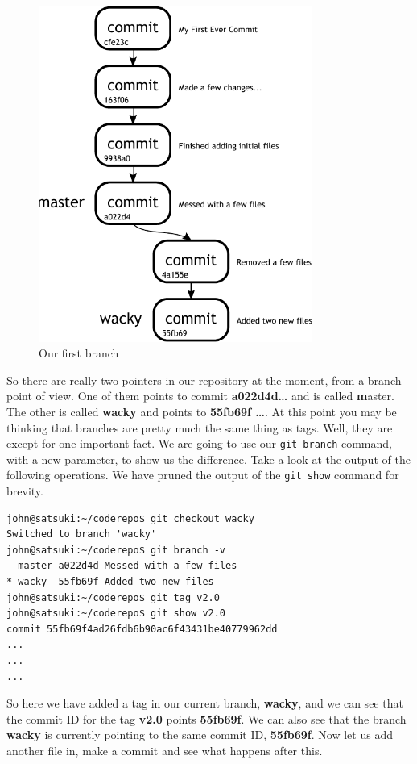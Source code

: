 \begin{figure}[hbt]
\centering
\includegraphics[width=9cm]{images/f-w4-d1.pdf}
\caption{Our first branch}
\end{figure}

So there are really two pointers in our repository at the moment, from a branch point of view.
One of them points to commit \textbf{a022d4d\ldots} and is called \textbf master.
The other is called \textbf{wacky} and points to \textbf{55fb69f
\ldots}.
At this point you may be thinking that branches are pretty much the same thing as tags.
Well, they are except for one important fact.
We are going to use our \texttt{git branch} command, with a new parameter, to show us the difference.
Take a look at the output of the following operations.
We have pruned the output of the \texttt{git show} command for brevity.

\begin{Verbatim}
john@satsuki:~/coderepo$ git checkout wacky
Switched to branch 'wacky'
john@satsuki:~/coderepo$ git branch -v
  master a022d4d Messed with a few files
* wacky  55fb69f Added two new files
john@satsuki:~/coderepo$ git tag v2.0
john@satsuki:~/coderepo$ git show v2.0
commit 55fb69f4ad26fdb6b90ac6f43431be40779962dd
...
...
...
\end{Verbatim}

So here we have added a tag in our current branch, \textbf{wacky}, and we can see that the commit ID for the tag \textbf{v2.0} points \textbf{55fb69f}.
We can also see that the branch \textbf{wacky} is currently pointing to the same commit ID, \textbf{55fb69f}.
Now let us add another file in, make a commit and see what happens after this.


